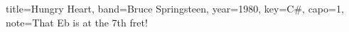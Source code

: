 \documentclass{skrul-leadsheet}
\begin{document}
\begin{song}[transpose-capo=true,enharmonic=flat]{title={Hungry Heart}, band={Bruce Springsteen}, year={1980}, key={C#}, capo={1}, note={That Eb is at the 7th fret!}}



\end{song}
\end{document}
